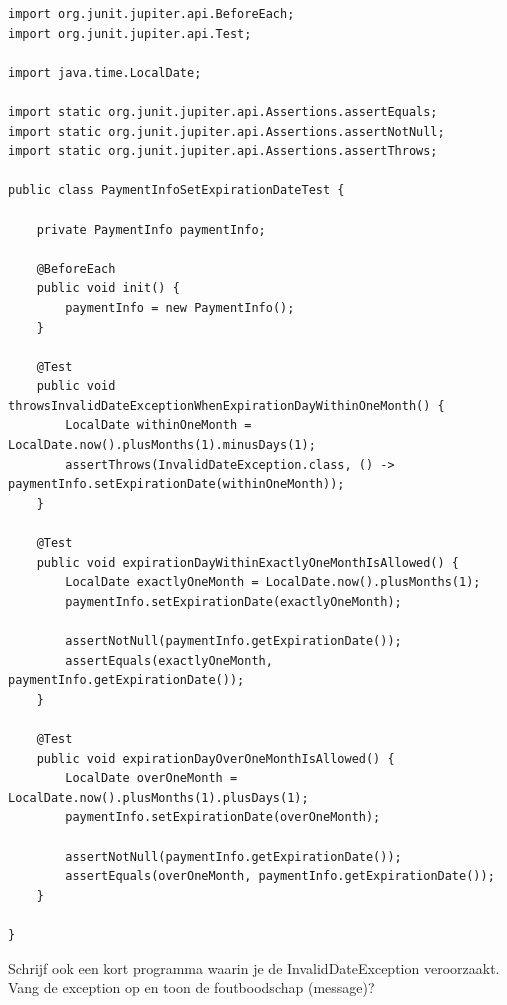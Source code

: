 \begin{lstlisting}
import org.junit.jupiter.api.BeforeEach;
import org.junit.jupiter.api.Test;

import java.time.LocalDate;

import static org.junit.jupiter.api.Assertions.assertEquals;
import static org.junit.jupiter.api.Assertions.assertNotNull;
import static org.junit.jupiter.api.Assertions.assertThrows;

public class PaymentInfoSetExpirationDateTest {

	private PaymentInfo paymentInfo;

	@BeforeEach
	public void init() {
		paymentInfo = new PaymentInfo();
	}

	@Test
	public void throwsInvalidDateExceptionWhenExpirationDayWithinOneMonth() {
		LocalDate withinOneMonth = LocalDate.now().plusMonths(1).minusDays(1);
		assertThrows(InvalidDateException.class, () -> paymentInfo.setExpirationDate(withinOneMonth));
	}

	@Test
	public void expirationDayWithinExactlyOneMonthIsAllowed() {
		LocalDate exactlyOneMonth = LocalDate.now().plusMonths(1);
		paymentInfo.setExpirationDate(exactlyOneMonth);

		assertNotNull(paymentInfo.getExpirationDate());
		assertEquals(exactlyOneMonth, paymentInfo.getExpirationDate());
	}

	@Test
	public void expirationDayOverOneMonthIsAllowed() {
		LocalDate overOneMonth = LocalDate.now().plusMonths(1).plusDays(1);
		paymentInfo.setExpirationDate(overOneMonth);

		assertNotNull(paymentInfo.getExpirationDate());
		assertEquals(overOneMonth, paymentInfo.getExpirationDate());
	}

}
\end{lstlisting} 

\begin{oefening}
Schrijf ook een kort programma waarin je de InvalidDateException veroorzaakt. Vang de exception op en toon de foutboodschap (message)?
\end{oefening}


